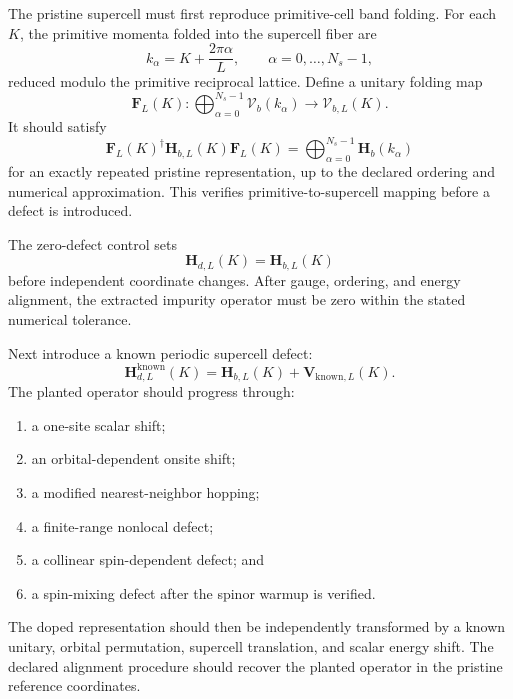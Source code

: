 The pristine supercell must first reproduce primitive-cell band folding. For
each $K$, the primitive momenta folded into the supercell fiber are
\begin{equation}
    k_{\alpha}
    =
    K+\frac{2\pi\alpha}{L},
    \qquad
    \alpha=0,\ldots,N_s-1,
\end{equation}
reduced modulo the primitive reciprocal lattice. Define a unitary folding map
\begin{equation}
    \mathbf F_L(K):
    \bigoplus_{\alpha=0}^{N_s-1}
    \mathcal V_b(k_{\alpha})
    \longrightarrow
    \mathcal V_{b,L}(K).
\end{equation}
It should satisfy
\begin{equation}
    \mathbf F_L(K)^\dagger
    \mathbf H_{b,L}(K)
    \mathbf F_L(K)
    =
    \bigoplus_{\alpha=0}^{N_s-1}
    \mathbf H_b(k_{\alpha})
\end{equation}
for an exactly repeated pristine representation, up to the declared ordering
and numerical approximation. This verifies primitive-to-supercell mapping
before a defect is introduced.

The zero-defect control sets
\begin{equation}
    \mathbf H_{d,L}(K)=\mathbf H_{b,L}(K)
\end{equation}
before independent coordinate changes. After gauge, ordering, and energy
alignment, the extracted impurity operator must be zero within the stated
numerical tolerance.

Next introduce a known periodic supercell defect:
\begin{equation}
    \mathbf H_{d,L}^{\mathrm{known}}(K)
    =
    \mathbf H_{b,L}(K)
    +
    \mathbf V_{\mathrm{known},L}(K).
\end{equation}
The planted operator should progress through:
\begin{enumerate}
    \item a one-site scalar shift;
    \item an orbital-dependent onsite shift;
    \item a modified nearest-neighbor hopping;
    \item a finite-range nonlocal defect;
    \item a collinear spin-dependent defect; and
    \item a spin-mixing defect after the spinor warmup is verified.
\end{enumerate}
The doped representation should then be independently transformed by a known
unitary, orbital permutation, supercell translation, and scalar energy shift.
The declared alignment procedure should recover the planted operator in the
pristine reference coordinates.

